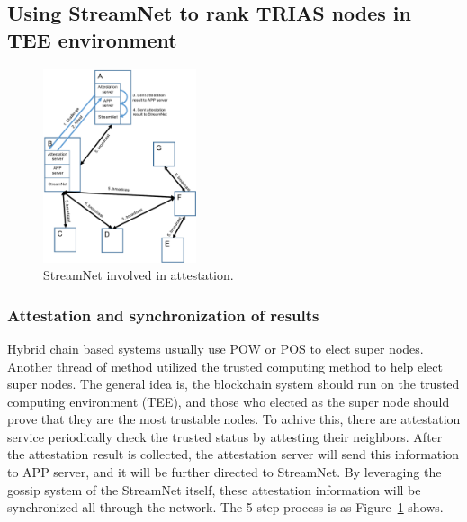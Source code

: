 \subsection{Using StreamNet to rank TRIAS nodes in TEE environment}

\begin{figure}[!ht]
        \begin{center}
                \includegraphics[width=0.40\textwidth]{figures/attestation.pdf}
                \caption{StreamNet involved in attestation.}
                \label{attestation}
        \end{center}
\end{figure}

\subsubsection{Attestation and synchronization of results}
Hybrid chain based systems usually use POW or POS to elect super nodes. 
Another thread of method utilized the trusted computing method \cite{ruan2017repcloud,ruan2014neuronvisor} to help elect super nodes. 
The general idea is, the blockchain system should run on the trusted computing environment (TEE),
and those who elected as the super node should prove that they are the most trustable nodes.
To achive this, there are attestation service periodically check the trusted status by attesting their neighbors. 
After the attestation result is collected, the attestation server will send this information to APP server, and it will be further directed to StreamNet.
By leveraging the gossip system of the StreamNet itself, these attestation information will be synchronized all through the network. The 5-step process is as Figure~\ref{attestation} shows.

